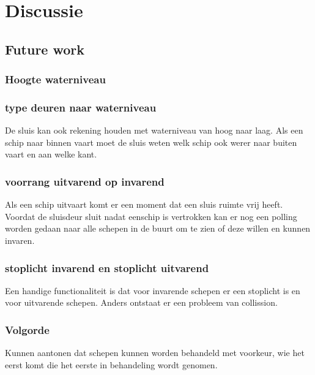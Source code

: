 \newpage
 
\section{Discussie}
\subsection{Future work}
\subsubsection{Hoogte waterniveau}

\subsubsection{type deuren naar waterniveau}
De sluis kan ook rekening houden met waterniveau van hoog naar laag.
Als een schip naar binnen vaart moet de sluis weten welk schip ook werer naar buiten vaart en aan welke kant.

\subsubsection{voorrang uitvarend op invarend}
Als een schip uitvaart komt er een moment dat een sluis ruimte vrij heeft. Voordat de sluisdeur sluit nadat eenschip is vertrokken kan er nog een polling worden gedaan naar alle schepen in de buurt om te zien of deze willen en kunnen invaren.

\subsubsection{stoplicht invarend en stoplicht uitvarend}
Een handige functionaliteit is dat voor invarende schepen er een stoplicht is en voor uitvarende schepen. Anders ontstaat er een probleem van collission. 

\subsubsection{Volgorde}
Kunnen aantonen dat schepen kunnen worden behandeld met voorkeur, wie het eerst komt die het eerste in behandeling wordt genomen.

 


\cite{boeing737maxdisplay}
\cite{fehrm24112020737changes}
